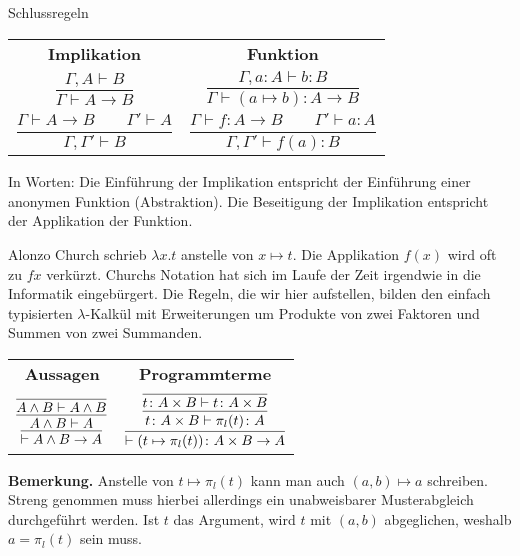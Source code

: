 \documentclass[8pt]{beamer}
\newcommand{\strong}[1]{\textsf{\textbf{#1}}}
\newcommand{\parspace}{\vspace{0.8em}}
\newcommand{\cond}{\rightarrow}
\begin{document}
\begin{frame}
\begin{block}{Schlussregeln}
\begin{center}
\begin{tabular}{c@{\qquad\qquad}c}
\strong{Implikation}
& \strong{Funktion}\\[10pt]
$\dfrac{\Gamma, A\vdash B}{\Gamma\vdash A\cond B}$
&
$\dfrac{\Gamma, a\colon A\vdash b\colon B}{\Gamma\vdash (a\mapsto b)\colon A\to B}$\\[18pt]
$\dfrac{\Gamma\vdash A\cond B\qquad\Gamma'\vdash A}{\Gamma,\Gamma'\vdash B}$
& $\dfrac{\Gamma\vdash f\colon A\to B\qquad\Gamma'\vdash a\colon A}{\Gamma,\Gamma'\vdash f(a)\colon B}$
\end{tabular}
\end{center}
\end{block}\pause

\parspace
In Worten: Die Einführung der Implikation entspricht der Einführung
einer anonymen Funktion (Abstraktion). Die Beseitigung der Implikation
entspricht der Applikation der Funktion.\pause

\parspace
Alonzo Church schrieb $\lambda x.t$ anstelle von $x\mapsto t$.
Die Applikation $f(x)$ wird oft zu $fx$ verkürzt.
Churchs Notation hat sich im Laufe der Zeit irgendwie in die Informatik
eingebürgert. Die Regeln, die wir hier aufstellen, bilden den einfach
typisierten $\lambda$-Kalkül mit Erweiterungen um Produkte von zwei
Faktoren und Summen von zwei Summanden.
\end{frame}

\begin{frame}
\begin{center}
\begin{tabular}{c@{\qquad\qquad}c}
\strong{Aussagen} & \strong{Programmterme}\\[8pt]
$\infer{\vdash A\land B\cond A}{
  \infer{A\land B\vdash A}{
    \infer{A\land B\vdash A\land B}{}}}$
&
$\infer{\vdash (t\mapsto \pi_l(t))\colon A\times B\to A}{
  \infer{t\colon A\times B\vdash \pi_l(t)\colon A}{
    \infer{t\colon A\times B\vdash t\colon A\times B}{}}}$
\end{tabular}
\end{center}\pause

\parspace
\strong{Bemerkung.}
Anstelle von $t\mapsto\pi_l(t)$ kann man auch $(a,b)\mapsto a$
schreiben. Streng genommen muss hierbei allerdings ein unabweisbarer
Musterabgleich durchgeführt werden. Ist $t$ das Argument, wird $t$
mit $(a,b)$ abgeglichen, weshalb $a=\pi_l(t)$ sein muss.
\end{frame}
\end{document}
